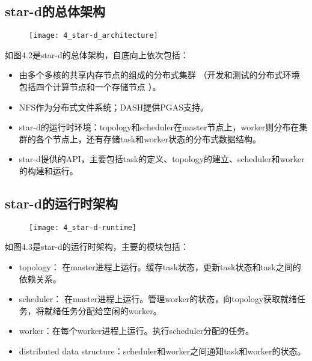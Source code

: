\subsection{star-d的总体架构}

\begin{figure}[!htbp]
    \centering
    \texttt{[image: 4\_star-d\_architecture]}
    \label{fig:4_star-d_architecture}
\end{figure}

如图4.2是star-d的总体架构，自底向上依次包括：

\begin{itemize}
	\item 由多个多核的共享内存节点的组成的分布式集群 （开发和测试的分布式环境包括四个计算节点和一个存储节点 ）。
	\item NFS作为分布式文件系统；DASH提供PGAS支持。
	\item star-d的运行时环境：topology和scheduler在master节点上，worker则分布在集群的各个节点上，还有存储task和worker状态的分布式数据结构。
	\item star-d提供的API，主要包括task的定义、topology的建立、scheduler和worker的构建和运行。
\end{itemize}

\subsection{star-d的运行时架构}

\begin{figure}[!htbp]
    \centering
    \texttt{[image: 4\_star-d-runtime]}
    \label{fig:4_star-d-runtime}
\end{figure}

如图4.3是star-d的运行时架构，主要的模块包括：

\begin{itemize}
	\item topology： 在master进程上运行。缓存task状态，更新task状态和task之间的依赖关系。
	\item scheduler： 在master进程上运行。管理worker的状态，向topology获取就绪任务，将就绪任务分配给空闲的worker。
	\item worker：在每个worker进程上运行。执行scheduler分配的任务。
	\item distributed data structure：scheduler和worker之间通知task和worker的状态。
\end{itemize}

